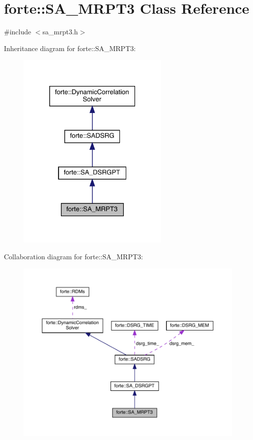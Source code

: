 \hypertarget{classforte_1_1_s_a___m_r_p_t3}{}\section{forte\+:\+:S\+A\+\_\+\+M\+R\+P\+T3 Class Reference}
\label{classforte_1_1_s_a___m_r_p_t3}


{\ttfamily \#include $<$sa\+\_\+mrpt3.\+h$>$}



Inheritance diagram for forte\+:\+:S\+A\+\_\+\+M\+R\+P\+T3\+:
\nopagebreak
\begin{figure}[H]
\begin{center}
\leavevmode
\includegraphics[width=210pt]{classforte_1_1_s_a___m_r_p_t3__inherit__graph}
\end{center}
\end{figure}


Collaboration diagram for forte\+:\+:S\+A\+\_\+\+M\+R\+P\+T3\+:
\nopagebreak
\begin{figure}[H]
\begin{center}
\leavevmode
\includegraphics[width=350pt]{classforte_1_1_s_a___m_r_p_t3__coll__graph}
\end{center}
\end{figure}
